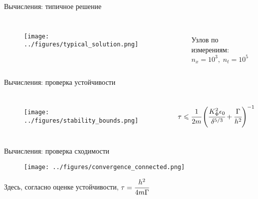 \documentclass[aspectratio=169]{beamer}
\begin{document}
\begin{frame}{Вычисления: типичное решение}
\vspace{-0.4cm}
\begin{columns}
\begin{figure}
	\texttt{[image: ../figures/typical\_solution.png]}
\end{figure}
\hfill \\
\vspace{4cm}
\hspace{-2.5cm}
Узлов по измерениям: \\
\hspace{-2.5cm}
$n_x = 10^3, \; n_t = 10^5$
\end{columns}
\end{frame}


\begin{frame}{Вычисления: проверка устойчивости}
\vspace{-0.4cm}
\begin{columns}
\begin{figure}
	\texttt{[image: ../figures/stability\_bounds.png]}
\end{figure}
$$\tau \leqslant \cfrac{1}{2m} \left( \cfrac{K_\Phi^2 \epsilon_0}{\delta^{5/3}} +
\cfrac{\Gamma}{h^2} \right)^{-1}$$
\end{columns}
\end{frame}


\begin{frame}{Вычисления: проверка сходимости}
\vspace{-0.3cm}
\begin{figure}
	\texttt{[image: ../figures/convergence\_connected.png]}
\end{figure}
\vspace{-0.6cm}
\begin{center}
	Здесь, согласно оценке устойчивости, $\tau = \cfrac{h^2}{4m \Gamma}$
\end{center}
\end{frame}
\end{document}
